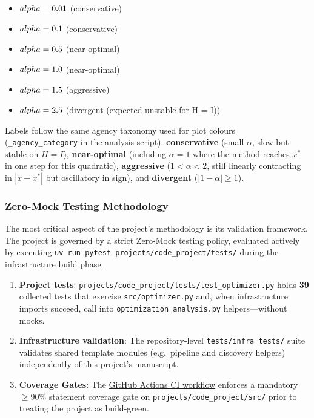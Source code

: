 \documentclass[
]{article}
\providecommand{\tightlist}{%
  \setlength{\itemsep}{0pt}\setlength{\parskip}{0pt}}
\begin{document}
\begin{itemize}
\tightlist
\item
  \(\\alpha = 0.01\) (conservative)
\item
  \(\\alpha = 0.1\) (conservative)
\item
  \(\\alpha = 0.5\) (near-optimal)
\item
  \(\\alpha = 1.0\) (near-optimal)
\item
  \(\\alpha = 1.5\) (aggressive)
\item
  \(\\alpha = 2.5\) (divergent (expected unstable for H = I))
\end{itemize}

Labels follow the same agency taxonomy used for plot colours
(\texttt{\_agency\_category} in the analysis script):
\textbf{conservative} (small \(\alpha\), slow but stable on \(H=I\)),
\textbf{near-optimal} (including \(\alpha=1\) where the method reaches
\(x^\ast\) in one step for this quadratic), \textbf{aggressive}
(\(1 < \alpha < 2\), still linearly contracting in \(|x-x^\ast|\) but
oscillatory in sign), and \textbf{divergent} (\(|1-\alpha| \geq 1\)).

\subsubsection{Zero-Mock Testing
Methodology}\label{zero-mock-testing-methodology}

The most critical aspect of the project's methodology is its validation
framework. The project is governed by a strict Zero-Mock testing policy,
evaluated actively by executing
\texttt{uv\ run\ pytest\ projects/code\_project/tests/} during the
infrastructure build phase.

\begin{enumerate}
\def\labelenumi{\arabic{enumi}.}
\tightlist
\item
  \textbf{Project tests}:
  \texttt{projects/code\_project/tests/test\_optimizer.py} holds
  \textbf{39} collected tests that exercise \texttt{src/optimizer.py}
  and, when infrastructure imports succeed, call into
  \texttt{optimization\_analysis.py} helpers---without mocks.
\item
  \textbf{Infrastructure validation}: The repository-level
  \texttt{tests/infra\_tests/} suite validates shared template modules
  (e.g.~pipeline and discovery helpers) independently of this project's
  manuscript.
\item
  \textbf{Coverage Gates}: The
  \href{https://github.com/docxology/template/blob/main/.github/workflows/ci.yml}{GitHub
  Actions CI workflow} enforces a mandatory \texorpdfstring{\ensuremath{\geq}}{>=}90\% statement coverage
  gate on \texttt{projects/code\_project/src/} prior to treating the
  project as build-green.
\end{enumerate}
\end{document}
